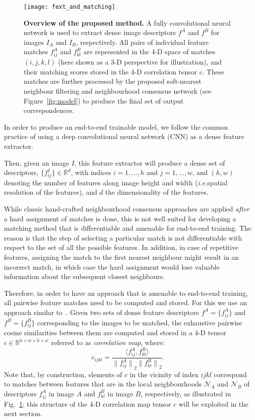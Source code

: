 \documentclass{article}
\begin{document}
\begin{figure}[t]
  \centering
    \texttt{[image: fext\_and\_matching]}
    \caption{\small \textbf{Overview of the proposed method.} A fully convolutional neural network is used to extract dense image descriptors $f^A$ and $f^B$ for images $I_A$ and $I_B$, respectively. All pairs of individual feature matches $f^A_{ij}$ and $f^B_{kl}$ are represented in the 4-D space of matches $(i,j,k,l)$ (here shown as a 3-D perspective for illustration), and their matching scores stored in the 4-D correlation tensor $c$. These matches are further processed by the proposed soft-nearest neighbour filtering and neighbourhood consensus network (see Figure~\ref{fig:model}) to produce the final set of output correspondences.\label{fig:fext_and_matching}}
\end{figure}


In order to produce an end-to-end trainable model, we follow the common practice of using a deep convolutional neural network (CNN)
as a dense feature extractor.

Then, given an image $I$, this feature extractor will produce a dense set of descriptors, $\{f^I_{ij}\} \in \mathbb{R}^d$,
with indices $i=1,\dots,h$ and $j=1,\dots,w$, and $(h,w)$ denoting the number of features along image height and width
(\emph{i.e.}\the spatial resolution of the features), and $d$ the dimensionality of the features.

While classic hand-crafted neighbourhood consensus approaches are applied \emph{after} a hard assignment of matches is done, this is not well suited for developing a matching method that is differentiable and amenable for end-to-end training. The reason is that the step of selecting a particular match
is not differentiable with respect to the set of all the possible features. In addition, in case of repetitive features, assigning the match to the first nearest neighbour might result in an incorrect match, in which case the hard assignment would lose valuable information about the subsequent closest neighbours.


Therefore, in order to have an approach that is amenable to end-to-end training, all pairwise feature matches need to be computed and stored. For this we use an approach similar to~\cite{Rocco17}. Given two sets of dense feature descriptors $f^A=\{f^A_{ij}\}$ and $f^B=\{f^B_{ij}\}$ corresponding to the images to be matched, the exhaustive pairwise cosine similarities between them are computed and stored in a 4-D tensor $c\in \mathbb{R}^{h\times w\times h\times w}$ referred to as \emph{correlation map}, where:
\begin{equation}
    c_{ijkl}=\frac{\langle f^A_{ij}, f^B_{kl}\rangle}{{\|f^A_{ij}\|}_2 {\|f^B_{kl}\|}_2}.
    \label{eq:corrmap}
\end{equation}
Note that, by construction, elements of $c$ in the vicinity of index $ijkl$ correspond to matches between features that are in the local neighbourhoods $\mathcal{N}_A$ and $\mathcal{N}_B$ of descriptors $f^A_{ij}$ in image $A$ and $f^B_{kl}$ in image $B$, respectively, as illustrated in Fig.~\ref{fig:fext_and_matching}; this structure of the 4-D correlation map tensor $c$ will be exploited in the next section.
\end{document}
